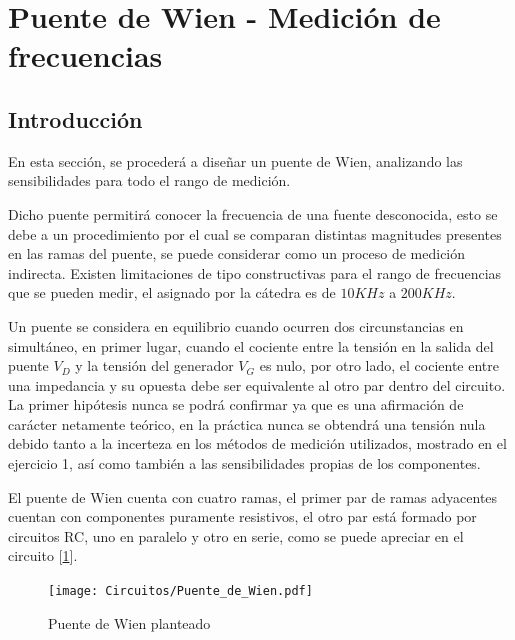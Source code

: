 


\section{Puente de Wien - Medición de frecuencias}

\subsection{Introducción}
En esta sección, se procederá a diseñar un puente de Wien, analizando las sensibilidades para todo el rango de medición. \par
Dicho puente permitirá conocer la frecuencia de una fuente desconocida, esto se debe a un procedimiento por el cual se comparan distintas magnitudes presentes en las ramas del puente, se puede considerar como un proceso de medición indirecta. Existen limitaciones de tipo constructivas para el rango de frecuencias que se pueden medir, el asignado por la cátedra es de $10KHz$ a $200KHz$.\par
Un puente se considera en equilibrio cuando ocurren dos circunstancias en simultáneo, en primer lugar, cuando el cociente entre la tensión en la salida del puente $V_D$ y la tensión del generador $V_G$ es nulo, por otro lado, el cociente entre una impedancia y su opuesta debe ser equivalente al otro par dentro del circuito. La primer hipótesis nunca se podrá confirmar ya que es una afirmación de carácter netamente teórico, en la práctica nunca se obtendrá una tensión nula debido tanto a la incerteza en los métodos de medición utilizados, mostrado en el ejercicio 1, así como también a las sensibilidades propias de los componentes. \par
El puente de Wien cuenta con cuatro ramas, el primer par de ramas adyacentes cuentan con componentes puramente resistivos, el otro par está formado por circuitos RC, uno en paralelo y otro en serie, como se puede apreciar en el circuito [\ref{fig:Puente_de_wien}]. \par


\begin{figure}[H]
\centering
\texttt{[image: Circuitos/Puente\_de\_Wien.pdf]}
\caption{Puente de Wien planteado}
\label{fig:Puente_de_wien}
\end{figure}


